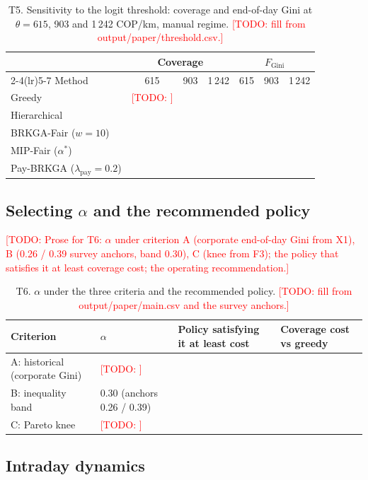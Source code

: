 \documentclass[preprint,12pt,authoryear]{elsarticle}%
\newcommand{\todo}[1]{\textcolor{red}{[TODO: #1]}}
\newcommand{\FG}{F_{\text{Gini}}}
\begin{document}
\begin{table}[ht]
\centering\small
\caption{T5. Sensitivity to the logit threshold: coverage and end-of-day Gini at $\theta = 615$, 903 and 1\,242 COP/km, manual regime. \todo{fill from output/paper/threshold.csv.}}
\label{tab:threshold}
\begin{tabular}{lcccccc}
\toprule
 & \multicolumn{3}{c}{Coverage} & \multicolumn{3}{c}{$\FG$} \\
\cmidrule(lr){2-4}\cmidrule(lr){5-7}
Method & 615 & 903 & 1\,242 & 615 & 903 & 1\,242 \\
\midrule
Greedy & \todo{} & & & & & \\
Hierarchical & & & & & & \\
BRKGA-Fair ($w=10$) & & & & & & \\
MIP-Fair ($\alpha^*$) & & & & & & \\
Pay-BRKGA ($\lambda_{\text{pay}}=0.2$) & & & & & & \\
\bottomrule
\end{tabular}
\end{table}

\subsection{Selecting $\alpha$ and the recommended policy}

\todo{Prose for T6: $\alpha$ under criterion A (corporate end-of-day Gini from X1), B (0.26 / 0.39 survey anchors, band 0.30), C (knee from F3); the policy that satisfies it at least coverage cost; the operating recommendation.}

\begin{table}[ht]
\centering\small
\caption{T6. $\alpha$ under the three criteria and the recommended policy. \todo{fill from output/paper/main.csv and the survey anchors.}}
\label{tab:alpha}
\begin{tabular}{llll}
\toprule
Criterion & $\alpha$ & Policy satisfying it at least cost & Coverage cost vs greedy \\
\midrule
A: historical (corporate Gini) & \todo{} & & \\
B: inequality band & 0.30 (anchors 0.26 / 0.39) & & \\
C: Pareto knee & \todo{} & & \\
\bottomrule
\end{tabular}
\end{table}

\subsection{Intraday dynamics}
\end{document}
